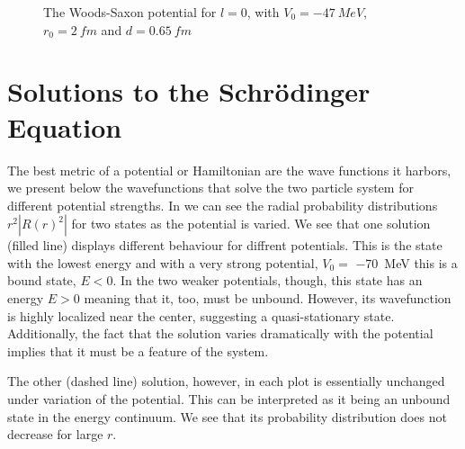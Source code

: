 \documentclass[../main/report.tex]{subfiles}
\begin{document}
\begin{figure}
  \centering
  \caption{The Woods-Saxon potential for $l = 0$, with $V_0 = \SI{-47}{MeV}$, $r_0 = \SI{2}{fm}$ and $d = \SI{0.65}{fm}$}
  \label{fig:woods-saxons}
\end{figure}

\section{Solutions to the Schrödinger Equation}

The best metric of a potential or Hamiltonian are the wave functions it harbors, we present below the wavefunctions that solve the two particle system for different potential strengths.
In  we can see the radial probability distributions $r^2|R(r)^2|$ for two states as the potential is varied.
 We see that one solution (filled line) displays different behaviour for diffrent potentials.
 This is the state with the lowest energy and with a very strong potential, $V_0 =$ \SI{-70}{MeV} this is a bound state, $E<0$. 
In the two weaker potentials, though, this state has an energy $E>0$ meaning that it, too, must be unbound. 
However, its wavefunction is highly localized near the center, suggesting a quasi-stationary state. 
Additionally, the fact that the solution varies dramatically with the potential implies that it must be a feature of the system.
 
The other (dashed line) solution, however, in each plot is essentially unchanged under variation of the potential. 
This can be interpreted as it being an unbound state in the energy continuum. We see that its probability distribution does not decrease for large $r$.


\end{document}
